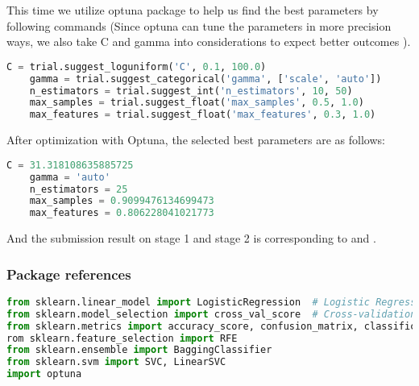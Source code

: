 This time we utilize optuna package to help us find the best parameters by following commands 
(Since optuna can tune the parameters in more precision ways, we also take C and gamma into considerations to expect better outcomes ).
\begin{lstlisting}[language=Python]
    C = trial.suggest_loguniform('C', 0.1, 100.0)
    gamma = trial.suggest_categorical('gamma', ['scale', 'auto'])
    n_estimators = trial.suggest_int('n_estimators', 10, 50)
    max_samples = trial.suggest_float('max_samples', 0.5, 1.0)
    max_features = trial.suggest_float('max_features', 0.3, 1.0)
\end{lstlisting}
\quad After optimization with Optuna, the selected best parameters are as follows:
\begin{lstlisting}[language=Python]
    C = 31.318108635885725
    gamma = 'auto'
    n_estimators = 25
    max_samples = 0.9099476134699473
    max_features = 0.806228041021773
\end{lstlisting}
\quad And the submission result on stage 1 and stage 2 is corresponding to and .

\subsubsection*{Package references}
\begin{lstlisting}[language=Python]
from sklearn.linear_model import LogisticRegression  # Logistic Regression model
from sklearn.model_selection import cross_val_score  # Cross-validation
from sklearn.metrics import accuracy_score, confusion_matrix, classification_report  # Evaluation metrics
rom sklearn.feature_selection import RFE
from sklearn.ensemble import BaggingClassifier
from sklearn.svm import SVC, LinearSVC
import optuna
\end{lstlisting}